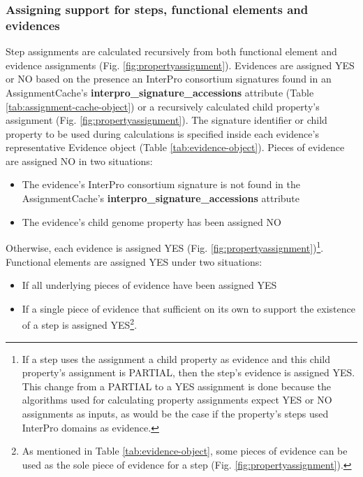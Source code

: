 \subsubsection{Assigning support for steps, functional elements and evidences}

Step assignments are calculated recursively from both functional element and 
evidence assignments (Fig. \ref{fig:propertyassignment}). Evidences are assigned 
YES or NO based on the presence an InterPro consortium signatures found in an 
AssignmentCache's \textbf{interpro\_signature\_accessions} attribute (Table 
\ref{tab:assignment-cache-object}) or a recursively calculated child property's 
assignment (Fig. \ref{fig:propertyassignment}). The signature identifier or 
child property to be used during calculations is specified inside each 
evidence's representative Evidence object (Table \ref{tab:evidence-object}). 
Pieces of evidence are assigned NO in two situations: 

\begin{itemize}
\item The evidence's InterPro consortium signature is not found in the 
AssignmentCache's \textbf{interpro\_signature\_accessions} attribute 
\item The evidence's child genome property has been assigned NO 
\end{itemize}

Otherwise, each evidence is assigned YES (Fig. 
\ref{fig:propertyassignment})\footnote{If a step uses the assignment a child 
property as evidence and this child property's assignment is PARTIAL, then the 
step's evidence is assigned YES. This change from a PARTIAL to a YES assignment 
is done because the algorithms used for calculating property assignments expect 
YES or NO assignments as inputs, as would be the case if the property's steps 
used InterPro domains as evidence.}. Functional elements are assigned YES under 
two situations: 

\begin{itemize}
\item If all underlying pieces of evidence have been assigned YES
\item If a single piece of evidence that sufficient on its own to support the 
existence of a step is assigned YES\footnote{As mentioned in Table 
\ref{tab:evidence-object}, some pieces of evidence can be used as the sole piece 
of evidence for a step (Fig. \ref{fig:propertyassignment}).}.
\end{itemize}

